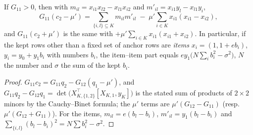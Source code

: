 \begin{lemma}\label{lem:cb}
If $G_{11}>0$, then with $m_{il}=x_{i1}x_{l2}-x_{l1}x_{i2}$ and $m'_{il}=x_{i1}y_l-x_{l1}y_i$,
\[
G_{11}(c_2-\mu')=\sum_{\{i,l\}\subseteq K}m_{il}m'_{il}\;-\;\mu'\sum_{i\in K}x_{i1}(x_{i1}-x_{i2}),
\]
and $G_{11}(c_2+\mu')$ is the same with $+\mu'\sum_{i\in K}x_{i1}(x_{i1}+x_{i2})$. In particular, if the kept rows other than a fixed set of anchor rows are \emph{items} $x_i=(1,1+eb_i)$, $y_i=y_0+y_1b_i$ with numbers $b_i$, the item--item part equals $ey_1\bigl(N\sum_{i}b_i^2-\sigma^2\bigr)$, $N$ the number and $\sigma$ the sum of the kept $b_i$.
\end{lemma}
\begin{proof}
$G_{11}c_2=G_{11}q_2-G_{12}(q_1-\mu')$, and $G_{11}q_2-G_{12}q_1=\det\bigl(X_{K,\{1,2\}}^{\top}[X_{K,1},y_K]\bigr)$ is the stated sum of products of $2\times2$ minors by the Cauchy--Binet formula; the $\mu'$ terms are $\mu'(G_{12}-G_{11})$ (resp.\ $\mu'(G_{12}+G_{11})$). For the items, $m_{il}=e(b_l-b_i)$, $m'_{il}=y_1(b_l-b_i)$ and $\sum_{\{i,l\}}(b_l-b_i)^2=N\sum b_i^2-\sigma^2$.
\end{proof}


